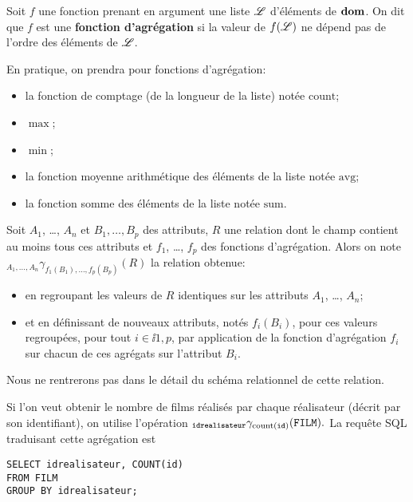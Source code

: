 \begin{defi}
  Soit $f$ une fonction prenant en argument une liste $\mathscr{L}$ d'éléments
  de $\mathbf{dom}$. On dit que $f$ est une \textbf{fonction d'agrégation} si la
  valeur de $f(\mathscr{L})$ ne dépend pas de l'ordre des éléments de $\mathscr{L}$.
\end{defi}
En pratique, on prendra pour fonctions d'agrégation:
\begin{itemize}
\item la fonction de comptage (de la longueur de la liste) notée $\mathrm{count}$;
\item $\max$;
\item $\min$;
\item la fonction moyenne arithmétique des éléments de la liste notée $\mathrm{avg}$;
\item la fonction somme des éléments de la liste notée $\mathrm{sum}$.
\end{itemize}
\begin{defi}
  Soit $A_{1}$, \ldots{}, $A_{n}$ et $B_{1}, \ldots,B_{p}$ des
  attributs, $R$ une relation dont le champ contient au moins tous
  ces attributs et $f_{1}$, \ldots{}, $f_{p}$ des fonctions d'agrégation.
  Alors on note
  ${}_{A_{1},\ldots,A_{n}}\gamma_{f_1(B_{1}),\ldots,f_p(B_{p})}(R)$ la relation
  obtenue:
  \begin{itemize}
  \item en regroupant les valeurs de $R$ identiques sur les attributs
    $A_{1}$, \ldots{}, $A_{n}$;
  \item et en définissant de nouveaux attributs, notés $f_{i}(B_{i})$,
    pour ces valeurs regroupées, pour tout $i\in\ii{1,p}$, par
    application de la fonction d'agrégation $f_{i}$ sur chacun de ces
    agrégats sur l'attribut $B_{i}$.
  \end{itemize}
\end{defi}
\begin{rem}
  Nous ne rentrerons pas dans le détail du schéma relationnel de cette relation. 
\end{rem}

\begin{exemple}
  Si l'on veut obtenir le nombre de films réalisés par chaque réalisateur (décrit par son identifiant), on utilise l'opération
$    {}_{\mathtt{idrealisateur}}\gamma_{\mathrm{count}(\mathtt{id})}(\mathtt{FILM}).$
  La requête SQL traduisant cette agrégation est 
\begin{verbatim}
SELECT idrealisateur, COUNT(id)
FROM FILM
GROUP BY idrealisateur;
\end{verbatim}
\end{exemple}


